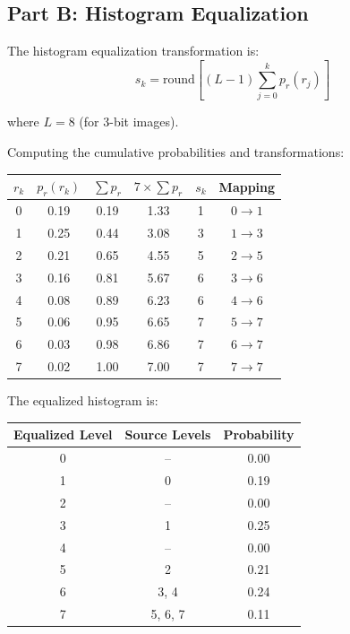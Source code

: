 \documentclass[12pt,a4paper]{article}
\begin{document}
\subsection*{Part B: Histogram Equalization}

The histogram equalization transformation is:
\begin{equation*}
s_k = \text{round}\left[(L-1) \sum_{j=0}^{k} p_r(r_j)\right]
\end{equation*}

where $L = 8$ (for 3-bit images).

Computing the cumulative probabilities and transformations:

\begin{center}
\begin{tabular}{|c|c|c|c|c|c|}
\hline
$r_k$ & $p_r(r_k)$ & $\sum p_r$ & $7 \times \sum p_r$ & $s_k$ & Mapping \\
\hline
0 & 0.19 & 0.19 & 1.33 & 1 & $0 \to 1$ \\
1 & 0.25 & 0.44 & 3.08 & 3 & $1 \to 3$ \\
2 & 0.21 & 0.65 & 4.55 & 5 & $2 \to 5$ \\
3 & 0.16 & 0.81 & 5.67 & 6 & $3 \to 6$ \\
4 & 0.08 & 0.89 & 6.23 & 6 & $4 \to 6$ \\
5 & 0.06 & 0.95 & 6.65 & 7 & $5 \to 7$ \\
6 & 0.03 & 0.98 & 6.86 & 7 & $6 \to 7$ \\
7 & 0.02 & 1.00 & 7.00 & 7 & $7 \to 7$ \\
\hline
\end{tabular}
\end{center}

The equalized histogram is:

\begin{center}
\begin{tabular}{|c|c|c|}
\hline
\textbf{Equalized Level} & \textbf{Source Levels} & \textbf{Probability} \\
\hline
0 & -- & 0.00 \\
1 & 0 & 0.19 \\
2 & -- & 0.00 \\
3 & 1 & 0.25 \\
4 & -- & 0.00 \\
5 & 2 & 0.21 \\
6 & 3, 4 & 0.24 \\
7 & 5, 6, 7 & 0.11 \\
\hline
\end{tabular}
\end{center}
\end{document}
